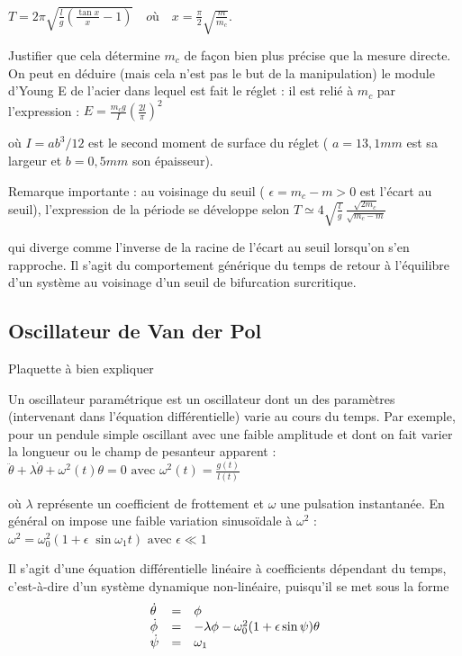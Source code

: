 \documentclass{article}%
\begin{document}
$T = 2\pi \sqrt {\frac{l}{g}\left( {\frac{\tan x}{x} - 1} \right)}\quad où \quad x = \frac{\pi }{2}\sqrt {\frac{m}{m_c }}$.

Justifier que cela détermine $m_c$ de façon bien plus précise que la mesure directe. On peut en déduire (mais cela n'est pas le but de la manipulation) le module d'Young E de l'acier dans lequel est fait le réglet : il est relié à $m_c$ par l'expression :
$E = \frac{m_c g}{I}\left( {\frac{2l}{\pi }} \right)^2$

où $I = ab^3/12$ est le second moment de surface du réglet ( $a=13,1 mm$ est sa largeur et $b=0,5 mm$ son épaisseur).

Remarque importante : au voisinage du seuil ( $\epsilon = m_c - m >0$ est l'écart au seuil), l'expression de la période se développe selon
$T \simeq \displaystyle 4 \sqrt{\frac{l}{g}}\,\frac{\sqrt{2m_c}}{\sqrt{m_c - m}}$

qui diverge comme l'inverse de la racine de l'écart au seuil lorsqu'on s'en rapproche. Il s'agit du comportement générique du temps de retour à l'équilibre d'un système au voisinage d'un seuil de bifurcation surcritique.

\subsection{Oscillateur de Van der Pol}
Plaquette à bien expliquer

Un oscillateur paramétrique est un oscillateur dont un des paramètres (intervenant dans l'équation différentielle) varie au cours du temps. Par exemple, pour un pendule simple oscillant avec une faible amplitude et dont on fait varier la longueur ou le champ de pesanteur apparent :
$ \ddot \theta + \lambda \dot\theta + \omega^2(t)\theta = 0\mbox{ avec } \omega^2(t) = \frac{g(t)}{l(t)}$

où $\lambda$ représente un coefficient de frottement et $\omega$ une pulsation instantanée. En général on impose une faible variation sinusoïdale à $\omega^2$ :
$ \omega^2 = \omega_0^2\left( {1 + \epsilon \;\sin \omega_1 t} \right) \mbox{ avec } \epsilon \ll 1$

Il s'agit d'une équation différentielle linéaire à coefficients dépendant du temps, c'est-à-dire d'un système dynamique non-linéaire, puisqu'il se met sous la forme
\[\begin{array}{l l l} \dot\theta &=& \phi\\ \dot\phi &=& -\lambda \phi - \omega_0^2 (1+\epsilon \sin\psi)\theta\\ \dot\psi &=& \omega_1\\ \end{array}\]
\end{document}
